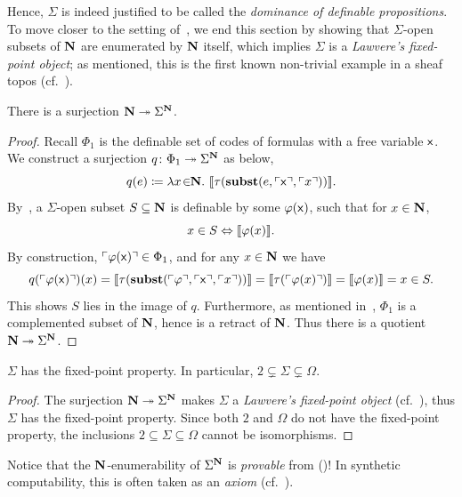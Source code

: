 Hence, $\Sigma$ is indeed justified to be called the \emph{dominance of definable propositions}. To move closer to the setting of~\citet{bauer_first_2006}, we end this section by showing that $\Sigma$-open subsets of $\mathbf N$ are enumerated by $\mathbf N$ itself, which implies $\Sigma$ is a \emph{Lawvere's fixed-point object}; as mentioned, this is the first known non-trivial example in a sheaf topos (cf.~\citet{bauer2026laugh}).

\begin{theorem}\label{thm:sigmalawverefixedpoint}
  There is a surjection $\mathbf N \twoheadrightarrow \Sigma^\mathbf N$.
\end{theorem}
\begin{proof}
  Recall $\Phi_1$ is the definable set of codes of formulas with a free variable $\mathsf{x}$. We construct a surjection $q \colon \Phi_1 \twoheadrightarrow \Sigma^\mathbf N$ as below,
  \[ q(e) \coloneq \lambda x\!\in\!\!\mathbf N.\  \llbracket\tau(\mathbf{subst}(e,\ulcorner \mathsf{x} \urcorner,\ulcorner x \urcorner))\rrbracket. \]
  By~, a $\Sigma$-open subset $S \subseteq \mathbf N$ is definable by some $\varphi(\mathsf{x})$, such that for $x\in \mathbf N$, 
  \[ x\in S \Leftrightarrow \llbracket\varphi(x)\rrbracket. \]
  By construction, $\ulcorner \varphi(\mathsf{x}) \urcorner\in\Phi_1$, and for any $x\in \mathbf N$ we have
  \[ q(\ulcorner \varphi(\mathsf{x}) \urcorner)(x) = \llbracket\tau(\mathbf{subst}(\ulcorner \varphi \urcorner,\ulcorner \mathsf{x} \urcorner,\ulcorner x \urcorner))\rrbracket = \llbracket\tau(\ulcorner \varphi(x) \urcorner)\rrbracket = \llbracket\varphi(x)\rrbracket = x\in S. \]
  This shows $S$ lies in the image of $q$. Furthermore, as mentioned in~, $\Phi_1$ is a complemented subset of $\mathbf N$, hence is a retract of $\mathbf N$. Thus there is a quotient $\mathbf N \twoheadrightarrow \Sigma^\mathbf N$. 
\end{proof}

\begin{corollary}[Diagonalisation]\label{cor:sigmafixedpoint}
  $\Sigma$ has the fixed-point property. In particular, $2 \subsetneq \Sigma \subsetneq \Omega$.
\end{corollary}
\begin{proof}
  The surjection $\mathbf N \twoheadrightarrow \Sigma^{\mathbf N}$ makes $\Sigma$ a \emph{Lawvere's fixed-point object} (cf.~\citet{lawvere_diagonal_1969}), thus $\Sigma$ has the fixed-point property. Since both $2$ and $\Omega$ do not have the fixed-point property, the inclusions $2 \subseteq \Sigma \subseteq \Omega$ cannot be isomorphisms.
\end{proof}

\begin{remark}
  Notice that the $\mathbf N$-enumerability of $\Sigma^\mathbf N$ is \emph{provable} from (\AxiomSQCA)! In synthetic computability, this is often taken as an \emph{axiom} (cf.~\citet{bauer_first_2006}).
\end{remark}

